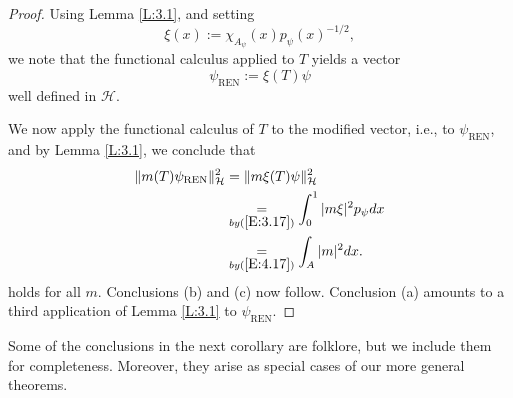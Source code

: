 \documentclass{birkmult}
\theoremstyle{definition}
\theoremstyle{remark}
\numberwithin{equation}{section}
\begin{document}
\begin{proof}
Using Lemma \ref{L:3.1}, and setting
\begin{equation}
\label{E:4.19}
  \xi(x) := \chi_{A_{\psi}}(x)p_{\psi}(x)^{-1/2},
\end{equation}
we note that the functional calculus applied to $T$ yields a vector
\begin{equation}
\label{E:4.20}
   \psi_{\text{REN}} := \xi(T)\psi
\end{equation}
well defined in $\mathcal{H}$.

We now apply the functional calculus of $T$ to the modified vector, i.e., to
$\psi_{\text{REN}}$, and by Lemma \ref{L:3.1}, we conclude that
\begin{align*}
  \|m(T)\psi_{\text{REN}}\|_{\mathcal{H}}^{2} 
  &= \|m\xi(T)\psi\|_{\mathcal{H}}^{2}  \\
  &\underset{by (\ref{E:3.17})}{=} \int_{0}^{1}|m\xi|^{2}p_{\psi}dx \\
  &\underset{by (\ref{E:4.17})}{=} \int_{A}|m|^{2}dx.
\end{align*}
holds for all $m$.  Conclusions (b) and (c) now follow.  Conclusion (a)
amounts to a third application of Lemma \ref{L:3.1} to $\psi_{\text{REN}}$.
\end{proof}

Some of the conclusions in the next corollary are folklore, but we 
include them for completeness.  Moreover, they arise as special cases 
of our more general theorems.
\end{document}
